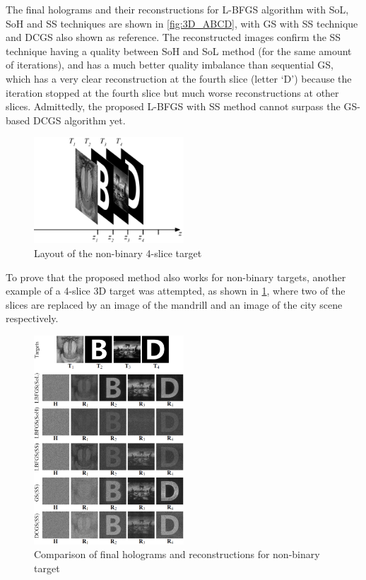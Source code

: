 The final holograms and their reconstructions for L-BFGS algorithm with SoL, SoH and SS techniques are shown in \cref{fig:3D_ABCD}, with GS with SS technique and DCGS also shown as reference. The reconstructed images confirm the SS technique having a quality between SoH and SoL method (for the same amount of iterations), and has a much better quality imbalance than sequential GS, which has a very clear reconstruction at the fourth slice (letter `D') because the iteration stopped at the fourth slice but much worse reconstructions at other slices. Admittedly, the proposed L-BFGS with SS method cannot surpass the GS-based DCGS algorithm yet.




\begin{figure}[h!]
	\centering
	\includegraphics[width=0.5\textwidth]{Fresnel_slice_mandrill_B_szzx_D}
	\caption{Layout of the non-binary 4-slice target}
	\label{fig:more_difficult_3d_target_layout}
\end{figure}

To prove that the proposed method also works for non-binary targets, another example of a 4-slice 3D target was attempted, as shown in \cref{fig:more_difficult_3d_target_layout}, where two of the slices are replaced by an image of the mandrill \cite{MANDRILL_REF} and an image of the city scene \cite{Zhang2017} respectively.

\begin{figure}[h!]
	\centering
	\includegraphics[width=0.5\textwidth]{final_holograms_reconstructions_4_slice_non_binary}
	\caption{Comparison of final holograms and reconstructions for non-binary target}
	\label{fig:more_difficult_3d_target_recon}
\end{figure}

